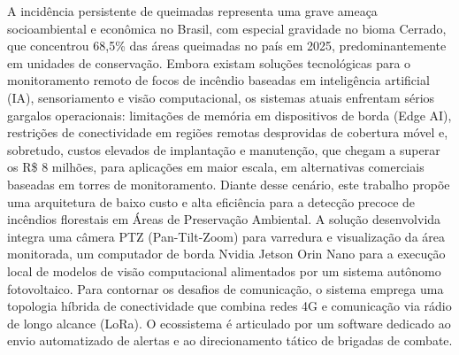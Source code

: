 
\begin{resumo}
A incidência persistente de queimadas representa uma grave ameaça socioambiental e econômica no Brasil, com especial gravidade no bioma Cerrado, que concentrou 68,5\% das áreas queimadas no país em 2025, predominantemente em unidades de conservação. Embora existam soluções tecnológicas para o monitoramento remoto de focos de incêndio baseadas em inteligência artificial (IA), sensoriamento e visão computacional, os sistemas atuais enfrentam sérios gargalos operacionais: limitações de memória em dispositivos de borda (Edge AI), restrições de conectividade em regiões remotas desprovidas de cobertura móvel e, sobretudo, custos elevados de implantação e manutenção, que chegam a superar os R\$ 8 milhões, para aplicações em maior escala, em alternativas comerciais baseadas em torres de monitoramento. Diante desse cenário, este trabalho propõe uma arquitetura de baixo custo e alta eficiência para a detecção precoce de incêndios florestais em Áreas de Preservação Ambiental. A solução desenvolvida integra uma câmera PTZ (Pan-Tilt-Zoom) para varredura e visualização da área monitorada, um computador de borda Nvidia Jetson Orin Nano para a execução local de modelos de visão computacional alimentados por um sistema autônomo fotovoltaico. Para contornar os desafios de comunicação, o sistema emprega uma topologia híbrida de conectividade que combina redes 4G e comunicação via rádio de longo alcance (LoRa). O ecossistema é articulado por um software dedicado ao envio automatizado de alertas e ao direcionamento tático de brigadas de combate.
\end{resumo}
